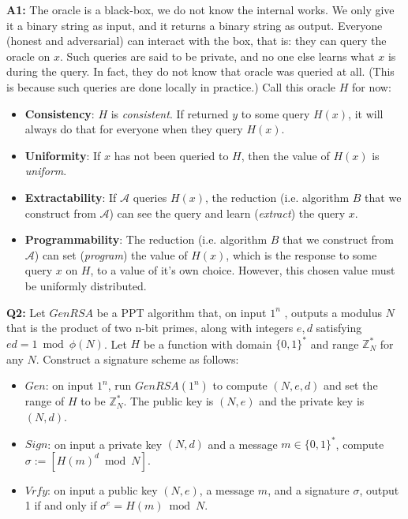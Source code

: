 \documentclass[12pt,reqno]{amsart}
\newcommand{\advrs}[0]{\mathcal{A}}
\begin{document}
\textbf{A1:} 
 The oracle is a black-box, we do not know the internal works. We only give it a binary string as input, and it returns a binary string as output. Everyone (honest and adversarial) can interact with the box, that is: they can query the oracle on $x$. Such queries are said to be private, and no one else learns what $x$ is during the query. In fact, they do not know that oracle was queried at all. (This is because such queries are done locally in practice.) Call this oracle $H$ for now:
\begin{itemize}
\item \textbf{Consistency}: $H$ is \textit{consistent}. If returned $y$ to some query $H(x)$, it will always do that for everyone when they query $H(x)$. 
\item \textbf{Uniformity}: If $x$ has not been queried to $H$, then the value of $H(x)$ is \textit{uniform}.
\item \textbf{Extractability}: If $\advrs$ queries $H(x)$, the reduction (i.e. algorithm $B$ that we construct from $\advrs$) can see the query and learn (\textit{extract}) the query $x$.
\item \textbf{Programmability}: The reduction (i.e. algorithm $B$ that we construct from $\advrs$) can set (\textit{program}) the value of $H(x)$, which is the response to some query $x$ on $H$, to a value of it's own choice. However, this chosen value must be uniformly distributed.
\end{itemize}

\newpage
\textbf{Q2:} Let $GenRSA$ be a PPT algorithm that, on input $1^n$ , outputs a modulus $N$ that is the product of two n-bit primes, along with integers $e,d$ satisfying $ed=1 \bmod \phi(N)$. Let $H$ be a function with domain $\{0, 1\}^*$ and range $\mathbb{Z}_N^*$ for any $N$. Construct a signature scheme as follows:

\begin{itemize}
\item $Gen$: on input $1^n$, run $GenRSA(1^n)$ to compute $(N, e, d)$ and set the range of $H$ to be $\mathbb{Z}_N^*$. The public key is $(N, e)$ and the private key is $(N, d)$.
\item  $Sign$: on input a private key $(N, d)$ and a message $m \in \{0,1\}^*$, compute $\sigma := [H(m)^d \bmod N]$.
\item  $Vrfy$: on input a public key $(N, e)$, a message $m$, and a signature $\sigma$, output 1 if and only if $\sigma^e = H(m) \bmod N$.
\end{itemize}
    
\end{document}
